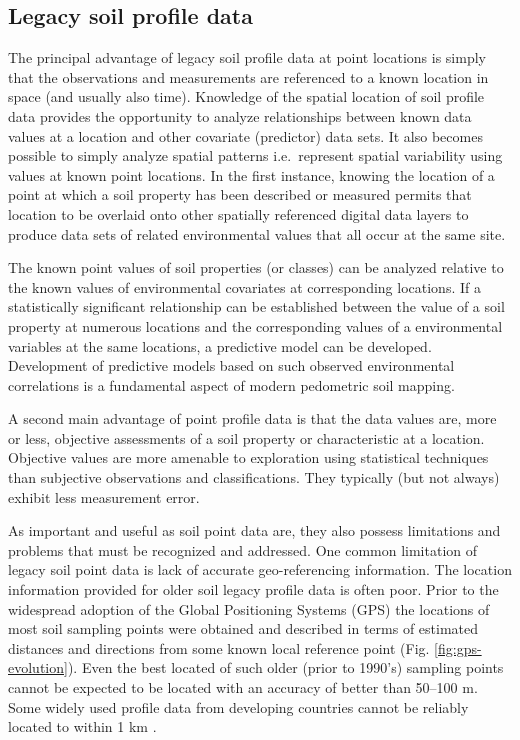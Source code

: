 \documentclass[11pt]{krantz}
\theoremstyle{definition}
\theoremstyle{definition}
\theoremstyle{definition}
\theoremstyle{remark}
\begin{document}
\hypertarget{legacy-soil-profile-data}{%
\subsection{Legacy soil profile data}\label{legacy-soil-profile-data}}

The principal advantage of legacy soil profile data at point locations
is simply that the observations and measurements are referenced to a
known location in space (and usually also time). Knowledge of the
spatial location of soil profile data provides the opportunity to
analyze relationships between known data values at a location and other
covariate (predictor) data sets. It also becomes possible to simply
analyze spatial patterns i.e.~represent spatial variability using values
at known point locations. In the first instance, knowing the location of
a point at which a soil property has been described or measured permits
that location to be overlaid onto other spatially referenced digital
data layers to produce data sets of related environmental values that
all occur at the same site.

The known point values of soil properties (or classes) can be analyzed
relative to the known values of environmental covariates at
corresponding locations. If a statistically significant relationship can
be established between the value of a soil property at numerous
locations and the corresponding values of a environmental variables at
the same locations, a predictive model can be developed. Development of
predictive models based on such observed environmental correlations is a
fundamental aspect of modern pedometric soil mapping.

A second main advantage of point profile data is that the data values
are, more or less, objective assessments of a soil property or
characteristic at a location. Objective values are more amenable to
exploration using statistical techniques than subjective observations
and classifications. They typically (but not always) exhibit less
measurement error.

As important and useful as soil point data are, they also possess
limitations and problems that must be recognized and addressed. One
common limitation of legacy soil point data is lack of accurate
geo-referencing information. The location information provided for older
soil legacy profile data is often poor. Prior to the widespread adoption
of the Global Positioning Systems (GPS) the locations of most soil
sampling points were obtained and described in terms of estimated
distances and directions from some known local reference point (Fig.
\ref{fig:gps-evolution}). Even the best located of such older (prior to
1990's) sampling points cannot be expected to be located with an
accuracy of better than 50--100 m. Some widely used profile data from
developing countries cannot be reliably located to within 1 km
\citep{Leenaars2012}.
\end{document}
